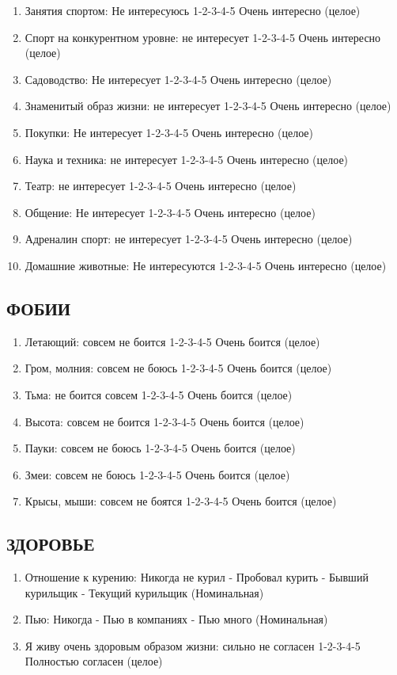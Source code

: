 \documentclass[11pt]{article}
\begin{document}
\begin{enumerate}
\item Занятия спортом: Не интересуюсь 1-2-3-4-5 Очень интересно (целое)
\item Спорт на конкурентном уровне: не интересует 1-2-3-4-5 Очень интересно (целое)
\item Садоводство: Не интересует 1-2-3-4-5 Очень интересно (целое)
\item Знаменитый образ жизни: не интересует 1-2-3-4-5 Очень интересно (целое)
\item Покупки: Не интересует 1-2-3-4-5 Очень интересно (целое)
\item Наука и техника: не интересует 1-2-3-4-5 Очень интересно (целое)
\item Театр: не интересует 1-2-3-4-5 Очень интересно (целое)
\item Общение: Не интересует 1-2-3-4-5 Очень интересно (целое)
\item Адреналин спорт: не интересует 1-2-3-4-5 Очень интересно (целое)
\item Домашние животные: Не интересуются 1-2-3-4-5 Очень интересно (целое)
\end{enumerate}
\subsection{ФОБИИ}
\begin{enumerate}
\item Летающий: совсем не боится 1-2-3-4-5 Очень боится (целое)
\item Гром, молния: совсем не боюсь 1-2-3-4-5 Очень боится (целое)
\item Тьма: не боится совсем 1-2-3-4-5 Очень боится (целое)
\item Высота: совсем не боится 1-2-3-4-5 Очень боится (целое)
\item Пауки: совсем не боюсь 1-2-3-4-5 Очень боится (целое)
\item Змеи: совсем не боюсь 1-2-3-4-5 Очень боится (целое)
\item Крысы, мыши: совсем не боятся 1-2-3-4-5 Очень боится (целое)
\end{enumerate}
\subsection{ЗДОРОВЬЕ}
\begin{enumerate}
\item Отношение к курению: Никогда не курил - Пробовал курить - Бывший курильщик - Текущий курильщик (Номинальная)
\item Пью: Никогда - Пью в компаниях - Пью много (Номинальная)
\item Я живу очень здоровым образом жизни: сильно не согласен 1-2-3-4-5 Полностью согласен (целое)
\end{enumerate}
\end{document}
